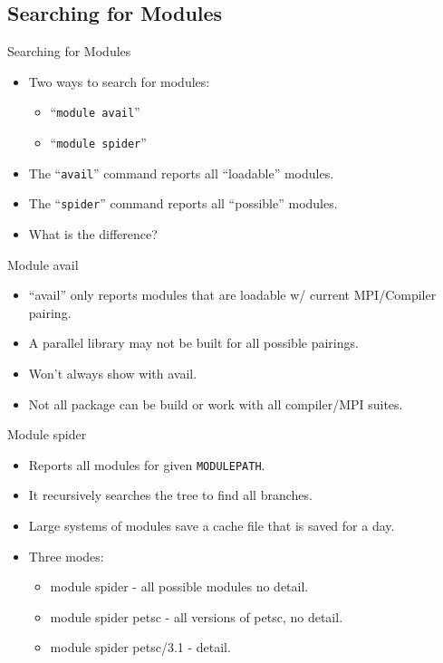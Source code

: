 \documentclass{beamer}
\begin{document}
\subsection{Searching for Modules}
\label{sec:search}


\begin{frame}{Searching for Modules}
  \begin{itemize}
    \item Two ways to search for modules:
      \begin{itemize}
        \item ``\texttt{module avail}''
        \item ``\texttt{module spider}''
      \end{itemize}
    \item The ``\texttt{avail}''  command reports all ``loadable'' modules.
    \item The ``\texttt{spider}'' command reports all ``possible'' modules.
    \item What is the difference?
  \end{itemize}
\end{frame}

\begin{frame}{Module avail}
  \begin{itemize}
    \item ``avail'' only reports modules that are loadable w/ current
      MPI/Compiler pairing.
    \item A parallel library may not be built for all possible pairings.
    \item Won't always show with avail.
    \item Not all package can be build or work with all compiler/MPI suites.
  \end{itemize}
\end{frame}

\begin{frame}{Module spider}
  \begin{itemize}
    \item Reports all modules for given \texttt{MODULEPATH}.
    \item It recursively searches the tree to find all branches.
    \item Large systems of modules save a cache file that is saved for
      a day.
    \item Three modes:
      \begin{itemize}
        \item module spider - all possible modules no detail.
        \item module spider petsc - all versions of petsc, no detail.
        \item module spider petsc/3.1 - detail.
      \end{itemize}
  \end{itemize}
\end{frame}
\end{document}
